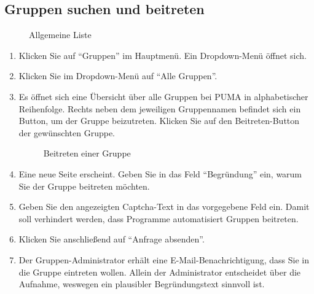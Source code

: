 \subsection{Gruppen suchen und beitreten}
\label{subsec:gruppenSuchenBeitreten}
\begin{figure}[h!]
 \centering
 \caption{Allgemeine Liste}
 \label{fig:allgemeineListe}
\end{figure}
\begin{enumerate}
    \item Klicken Sie auf \enquote{Gruppen} im Hauptmenü. Ein Dropdown-Menü öffnet sich.
    \item Klicken Sie im Dropdown-Menü auf \enquote{Alle Gruppen}.
    \item Es öffnet sich eine Übersicht über alle Gruppen bei PUMA in alphabetischer Reihenfolge. Rechts neben dem jeweiligen Gruppennamen befindet sich ein Button, um der Gruppe beizutreten. Klicken Sie auf den Beitreten-Button der gewünschten Gruppe.
\begin{figure}[h!]
 \centering
 \caption{Beitreten einer Gruppe}
 \label{fig:gruppeBeitreten}
\end{figure}
    \item Eine neue Seite erscheint. Geben Sie in das Feld \enquote{Begründung} ein, warum Sie der Gruppe beitreten möchten.
    \item Geben Sie den angezeigten Captcha-Text in das vorgegebene Feld ein. Damit soll verhindert werden, dass Programme automatisiert Gruppen beitreten. 
    \item Klicken Sie anschließend auf \enquote{Anfrage absenden}.
    \item Der Gruppen-Administrator erhält eine E-Mail-Benachrichtigung, dass Sie in die Gruppe eintreten wollen. Allein der Administrator entscheidet über die Aufnahme, weswegen ein plausibler Begründungstext sinnvoll ist.
\end{enumerate}
